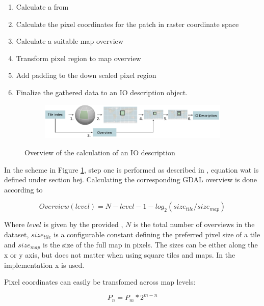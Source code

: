 \begin{enumerate}
\item Calculate a  from 
\item Calculate the pixel coordinates for the patch in raster coordinate space
\item Calculate a suitable map overview
\item Transform pixel region to map overview
\item Add padding to the down scaled pixel region
\item Finalize the gathered data to an IO description object.
\end{enumerate}

\begin{figure}[htbp]
    \centering
    \begin{subfigure}[bt]{0.9\textwidth}
        \includegraphics[width=\textwidth]{figures/implementation/pipeline/getiodescription.pdf}
    \end{subfigure}
    \caption{Overview of the calculation of an IO description}
    \label{fig:getiodescription}
\end{figure}

In the scheme in Figure \ref{fig:getiodescription}, step one is performed as described in , equation wat is defined under section hej. 
Calculating the corresponding GDAL overview is done according to

\begin{equation}
\label{eq:overview}
Overview(level) = N - level - 1 - log_2(size_{tile} / size_{map})
\end{equation}

Where $level$ is given by the provided , $N$ is the total number of overviews in the dataset, $size_{tile}$ is a configurable constant defining the preferred pixel size of a tile and $size_{map}$ is the size of the full map in pixels. The sizes can be either along the x or y axis, but does not matter when using square tiles and maps. In the implementation x is used.

Pixel coordinates can easily be transfomed across map levels:

\begin{equation}
\label{eq:overview}
P_{n} = P_{m} * 2^{m-n}
\end{equation}

